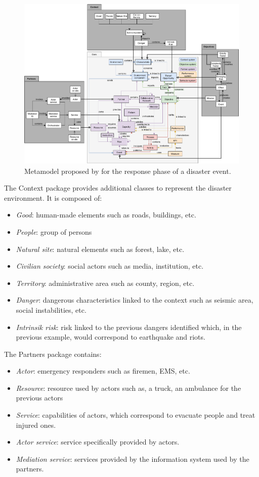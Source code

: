 \begin{figure}[htb]
    \centering
    \includegraphics[width=\textwidth]{figures/chap-3/benaben-metamodel-response.pdf}
    \caption{Metamodel proposed by \textcite{benabenMetamodelKnowledgeManagement2016} for the response phase of a disaster event.}
    \label{information:benaben-metamodel}
\end{figure}

The Context package provides additional classes to represent the disaster environment.
It is composed of:
\begin{itemize}
    \item \textit{Good}: human-made elements such as roads, buildings, etc.
    \item \textit{People}: group of persons
    \item \textit{Natural site}: natural elements such as forest, lake, etc.
    \item \textit{Civilian society}: social actors such as media, institution, etc.
    \item \textit{Territory}: administrative area such as county, region, etc.
    \item \textit{Danger}: dangerous characteristics linked to the context such as seismic area, social instabilities, etc.
    \item \textit{Intrinsik risk}: risk linked to the previous dangers identified which, in the previous example, would correspond to earthquake and riots.
\end{itemize}

The Partners package contains:
\begin{itemize}
    \item \textit{Actor}: emergency responders such as firemen, EMS, etc.
    \item \textit{Resource}: resource used by actors such as, a truck, an ambulance for the previous actors
    \item \textit{Service}: capabilities of actors, which correspond to evacuate people and treat injured ones.
    \item \textit{Actor service}: service specifically provided by actors.
    \item \textit{Mediation service}: services provided by the information system used by the partners.
\end{itemize}

